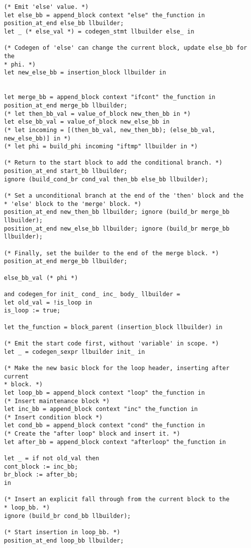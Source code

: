 \begin{verbatim}
(* Emit 'else' value. *)
let else_bb = append_block context "else" the_function in
position_at_end else_bb llbuilder;
let _ (* else_val *) = codegen_stmt llbuilder else_ in

(* Codegen of 'else' can change the current block, update else_bb for the
* phi. *)
let new_else_bb = insertion_block llbuilder in


let merge_bb = append_block context "ifcont" the_function in
position_at_end merge_bb llbuilder;
(* let then_bb_val = value_of_block new_then_bb in *)
let else_bb_val = value_of_block new_else_bb in
(* let incoming = [(then_bb_val, new_then_bb); (else_bb_val, new_else_bb)] in *)
(* let phi = build_phi incoming "iftmp" llbuilder in *)

(* Return to the start block to add the conditional branch. *)
position_at_end start_bb llbuilder;
ignore (build_cond_br cond_val then_bb else_bb llbuilder);

(* Set a unconditional branch at the end of the 'then' block and the
* 'else' block to the 'merge' block. *)
position_at_end new_then_bb llbuilder; ignore (build_br merge_bb llbuilder);
position_at_end new_else_bb llbuilder; ignore (build_br merge_bb llbuilder);

(* Finally, set the builder to the end of the merge block. *)
position_at_end merge_bb llbuilder;

else_bb_val (* phi *)

and codegen_for init_ cond_ inc_ body_ llbuilder = 
let old_val = !is_loop in
is_loop := true;

let the_function = block_parent (insertion_block llbuilder) in

(* Emit the start code first, without 'variable' in scope. *)
let _ = codegen_sexpr llbuilder init_ in

(* Make the new basic block for the loop header, inserting after current
* block. *)
let loop_bb = append_block context "loop" the_function in
(* Insert maintenance block *)
let inc_bb = append_block context "inc" the_function in
(* Insert condition block *)
let cond_bb = append_block context "cond" the_function in
(* Create the "after loop" block and insert it. *)
let after_bb = append_block context "afterloop" the_function in

let _ = if not old_val then
cont_block := inc_bb;
br_block := after_bb;
in

(* Insert an explicit fall through from the current block to the
* loop_bb. *)
ignore (build_br cond_bb llbuilder);

(* Start insertion in loop_bb. *)
position_at_end loop_bb llbuilder;


\end{verbatim}
